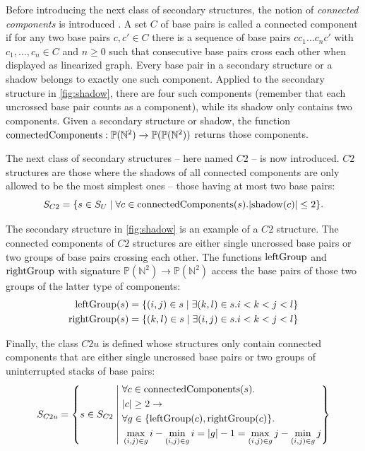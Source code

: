 \documentclass[
    a4paper,
    12pt,
    twoside,
    BCOR=12mm,
    parskip=half,
    chapterprefix,
    numbers=noenddot,
    bibliography=totoc
]{scrbook}
\begin{document}
Before introducing the next class of secondary structures, the notion of \emph{connected components} is introduced \citep{reidys_topology_2011}. A set $C$ of base pairs is called a connected component if for any two base pairs $c,c' \in C$ there is a sequence of base pairs $c c_1 \ldots c_n c'$ with $c_1,\ldots,c_n \in C$ and $n \geq 0$ such that consecutive base pairs cross each other when displayed as linearized graph. Every base pair in a secondary structure or a shadow belongs to exactly one such component. Applied to the secondary structure in \cref{fig:shadow}, there are four such components (remember that each uncrossed base pair counts as a component), while its shadow only contains two components. Given a secondary structure or shadow, the function $\mathrm{connectedComponents} : \mathbb{P}(\mathbb{N}^2) \to \mathbb{P}(\mathbb{P}(\mathbb{N}^2))$ returns those components. 

The next class of secondary structures -- here named $C2$ -- is now introduced. $C2$ structures are those where the shadows of all connected components are only allowed to be the most simplest ones -- those having at most two base pairs:
\begin{equation}
	S_{C2} = \{ s \in S_U \mid \forall c \in \mathrm{connectedComponents}(s).|\mathrm{shadow}(c)| \leq 2 \}.
\end{equation}

The secondary structure in \cref{fig:shadow} is an example of a $C2$ structure. The connected components of $C2$ structures are either single uncrossed base pairs or two groups of base pairs crossing each other. The functions $\mathrm{leftGroup}$ and $\mathrm{rightGroup}$ with signature $\mathbb{P}(\mathbb{N}^2) \to \mathbb{P}(\mathbb{N}^2)$ access the base pairs of those two groups of the latter type of components:
\begin{align}
	\mathrm{leftGroup}(s) = \{ (i,j) \in s \mid \exists (k,l) \in s. i<k<j<l \}\\
	\mathrm{rightGroup}(s) = \{ (k,l) \in s \mid \exists (i,j) \in s. i<k<j<l \}
\end{align}

Finally, the class $C2u$ is defined whose structures only contain connected components that are either single uncrossed base pairs or two groups of uninterrupted stacks of base pairs:
\begin{equation}
	S_{C2u} = \left\{ s \in S_{C2} \;\middle\vert\;
	\begin{aligned}
		&\forall c \in \op{connectedComponents}(s).\\
		& |c| \geq 2 \to\\
		&\forall g \in \{ \op{leftGroup}(c),\op{rightGroup}(c) \}.\\
		 & \max_{(i,j) \in g} i - \min_{(i,j) \in g} i
		 = |g|-1 =
		 \max_{(i,j) \in g} j - \min_{(i,j) \in g} j
	\end{aligned}
  \right\}
\end{equation}
\end{document}

